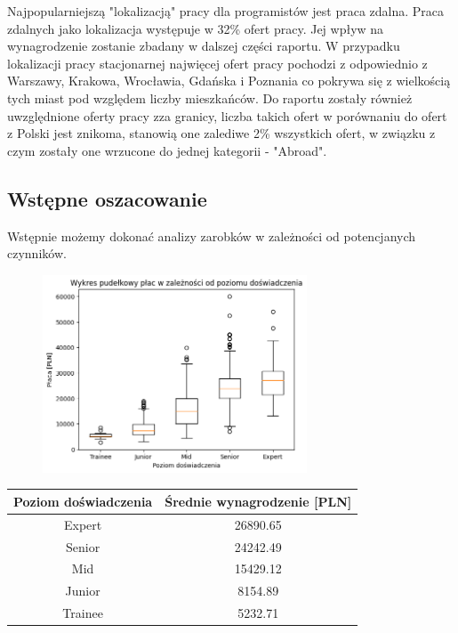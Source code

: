 \documentclass{article}
\begin{document}
Najpopularniejszą "lokalizacją" pracy dla programistów jest praca zdalna.
Praca zdalnych jako lokalizacja występuje w 32\% ofert pracy. Jej wpływ na wynagrodzenie
zostanie zbadany w dalszej części raportu.
W przypadku lokalizacji pracy stacjonarnej najwięcej ofert pracy pochodzi z odpowiednio z 
Warszawy, Krakowa, Wrocławia, Gdańska i Poznania co pokrywa się z wielkością tych miast
pod względem liczby mieszkańców.
Do raportu zostały również uwzględnione oferty pracy zza granicy, liczba takich ofert
w porównaniu do ofert z Polski jest znikoma, stanowią one zalediwe 2\% wszystkich ofert,
w związku z czym zostały one wrzucone do jednej kategorii - "Abroad".

\subsection{Wstępne oszacowanie}

Wstępnie możemy dokonać analizy zarobków w zależności od potencjanych czynników.

\begin{figure}[!hbt]
    \centering
    \includegraphics[width=0.7\textwidth]{img/box_zarobki_exp.png}
\end{figure}

\begin{table}[!hbt]
    \centering
    \begin{tabular}{|c|c|}
        \hline
        \textbf{Poziom doświadczenia} & \textbf{Średnie wynagrodzenie [PLN]} \\ \hline
        Expert & 26890.65 \\ \hline
        Senior & 24242.49 \\ \hline
        Mid & 15429.12 \\ \hline
        Junior & 8154.89 \\ \hline
        Trainee & 5232.71 \\ \hline
    \end{tabular}
\end{table}
\end{document}
